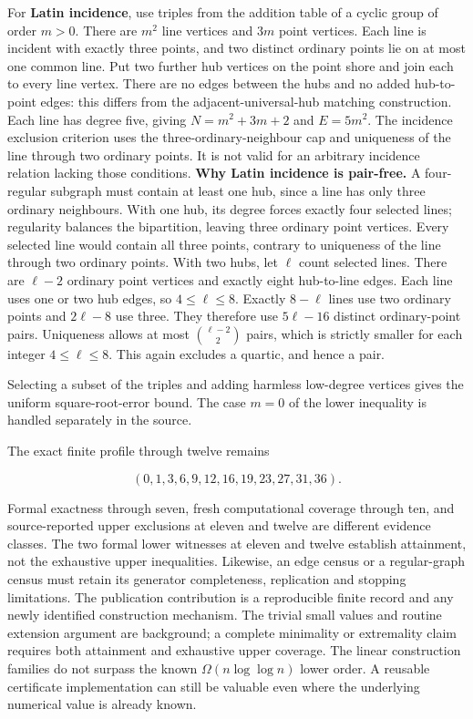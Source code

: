 \documentclass[smallextended]{svjour3}
\begin{document}
For \textbf{Latin incidence}, use triples from the addition table of a
cyclic group of order \(m>0\). There are \(m^2\) line vertices and
\(3m\) point vertices. Each line is incident with exactly three points,
and two distinct ordinary points lie on at most one common line. Put two
further hub vertices on the point shore and join each to every line
vertex. There are no edges between the hubs and no added hub-to-point
edges: this differs from the adjacent-universal-hub matching
construction. Each line has degree five, giving \(N=m^2+3m+2\) and
\(E=5m^2\). The incidence exclusion criterion uses the
three-ordinary-neighbour cap and uniqueness of the line through two
ordinary points. It is not valid for an arbitrary incidence relation
lacking those conditions. \textbf{Why Latin incidence is pair-free.} A
four-regular subgraph must contain at least one hub, since a line has
only three ordinary neighbours. With one hub, its degree forces exactly
four selected lines; regularity balances the bipartition, leaving three
ordinary point vertices. Every selected line would contain all three
points, contrary to uniqueness of the line through two ordinary points.
With two hubs, let \(\ell\) count selected lines. There are \(\ell-2\)
ordinary point vertices and exactly eight hub-to-line edges. Each line
uses one or two hub edges, so \(4\le\ell\le8\). Exactly \(8-\ell\) lines
use two ordinary points and \(2\ell-8\) use three. They therefore use
\(5\ell-16\) distinct ordinary-point pairs. Uniqueness allows at most
\(\binom{\ell-2}{2}\) pairs, which is strictly smaller for each integer
\(4\le\ell\le8\). This again excludes a quartic, and hence a pair.

Selecting a subset of the triples and adding harmless low-degree
vertices gives the uniform square-root-error bound. The case \(m=0\) of
the lower inequality is handled separately in the source.

The exact finite profile through twelve remains

\[ (0,1,3,6,9,12,16,19,23,27,31,36). \]

Formal exactness through seven, fresh computational coverage through
ten, and source-reported upper exclusions at eleven and twelve are
different evidence classes. The two formal lower witnesses at eleven and
twelve establish attainment, not the exhaustive upper inequalities.
Likewise, an edge census or a regular-graph census must retain its
generator completeness, replication and stopping limitations. The
publication contribution is a reproducible finite record and any newly
identified construction mechanism. The trivial small values and routine
extension argument are background; a complete minimality or extremality
claim requires both attainment and exhaustive upper coverage. The linear
construction families do not surpass the known \(\Omega(n\log\log n)\)
lower order. A reusable certificate implementation can still be valuable
even where the underlying numerical value is already known.
\end{document}
